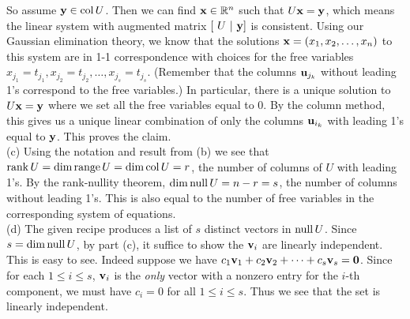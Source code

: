 \begin{solution}
So assume ${\mathbf y}\in \operatorname{col} U$. Then we can find ${\mathbf x}\in{\mathbb R}^n$ such that $U{\mathbf x}={\mathbf y}$, which means the linear system with augmented matrix $[\ U\ \vert \ \boldy]$ is consistent. Using our Gaussian elimination theory, we know that the solutions ${\mathbf x}=(x_1,x_2,\dots, x_n)$ to this system are in 1-1 correspondence with choices for the free variables $x_{j_1}=t_{j_1}, x_{j_2}=t_{j_2}, \dots, x_{j_s}=t_{j_s}$. (Remember that the columns ${\mathbf u}_{j_k}$ without leading 1's correspond to the free variables.) In particular, there is a unique solution to $U{\mathbf x}={\mathbf y}$ where we set all the free variables equal to 0. By the column method, this gives us a unique linear combination of only the columns ${\mathbf u}_{i_k}$ with leading 1's equal to ${\mathbf y}$. This proves the claim. 
\\
(c) Using the notation and result from (b) we see that $\operatorname{rank} U=\dim\operatorname{range} U=\dim\operatorname{col} U=r$, the number of columns of $U$ with leading 1's. By the rank-nullity theorem, $\dim\operatorname{null} U=n-r=s$, the number of columns without leading 1's. This is also equal to the number of free variables in the corresponding system of equations. 
\\
(d) The given recipe produces a list of $s$ distinct vectors in $\operatorname{null} U$. Since $s=\dim\operatorname{null} U$, by part (c), it suffice to show the ${\mathbf v}_i$ are linearly independent. This is easy to see. Indeed suppose we have $c_1{\mathbf v}_1+c_2{\mathbf v}_2+\cdots +c_s{\mathbf v}_s={\mathbf 0}$. Since for each $1\leq i\leq s$, ${\mathbf v}_i$ is the {\em only} vector with a nonzero entry for the $i$-th component, we must have $c_i=0$ for all $1\leq i\leq s$.  Thus we see that the set is linearly independent. 
\end{solution}


\ee